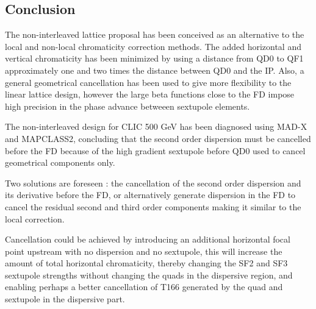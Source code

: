  \subsection{Conclusion}
The non-interleaved lattice proposal has been conceived as an alternative to the local and non-local chromaticity correction methods. The added horizontal and vertical chromaticity has been minimized by using a distance from QD0 to QF1 approximately one and two times the distance between QD0 and the IP. Also, a general geometrical cancellation has been used to give more flexibility to the linear lattice design, however the large beta functions close to the FD impose high precision in the phase advance betweeen sextupole elements.\par
The non-interleaved design for CLIC 500 GeV has been diagnosed using MAD-X and MAPCLASS2, concluding that the second order dispersion must be cancelled before the FD because of the high gradient sextupole before QD0 used to cancel geometrical components only.\par
Two solutions are foreseen : the cancellation of the second order dispersion and its derivative before the FD, or alternatively generate dispersion in the FD to cancel the residual second and third order components making it similar to the local correction.\par
Cancellation could be achieved by introducing an additional horizontal focal point upstream with no dispersion and no sextupole, this will increase the amount of total horizontal chromaticity, thereby changing the SF2 and SF3 sextupole strengths without changing the quads in the dispersive region, and enabling perhaps a better cancellation of T166 generated by the quad and sextupole in the dispersive part.%
